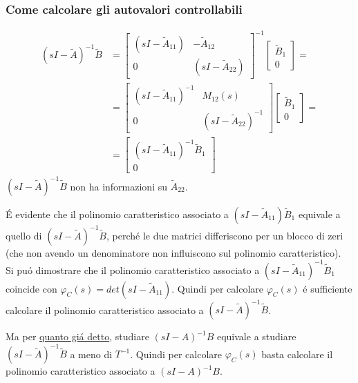 \documentclass[../main.tex]{subfiles}
\begin{document}
	\subsubsection{Come calcolare gli autovalori controllabili}
		\begin{align*}
			(sI-\tilde A)^{-1} \tilde B &=
			\begin{bmatrix}
				(sI-\tilde A_{11}) & -\tilde A_{12}\\
				0 & (sI-\tilde A_{22})
			\end{bmatrix}^{-1}
			\begin{bmatrix}
				\tilde B_1\\
				0
			\end{bmatrix} =\\
			&= \begin{bmatrix}
				(sI-\tilde A_{11})^{-1} & M_{12}(s)\\
				0 & (sI-\tilde A_{22})^{-1}
			\end{bmatrix}
			\begin{bmatrix}
				\tilde B_1\\
				0
			\end{bmatrix} =\\
			&= \begin{bmatrix}
				(sI-\tilde A_{11})^{-1} \tilde B_1\\
				0
			\end{bmatrix}
		\end{align*}
		$ (sI-\tilde A)^{-1} \tilde B $ non ha informazioni su $ \tilde A_{22} $.
		
		\'E evidente che il polinomio caratteristico associato a $ (sI-\tilde A_{11}) \tilde B_1 $ equivale a quello di $ (sI - \tilde A)^{-1} \tilde B $, perch\'e le due matrici differiscono per un blocco di zeri (che non avendo un denominatore non influiscono sul polinomio caratteristico).\\
		Si pu\'o dimostrare che il polinomio caratteristico associato a $ (sI-\tilde A_{11})^{-1} \tilde B_1 $ coincide con $ \varphi_C(s) = det(sI-\tilde A_{11}) $. Quindi per calcolare $ \varphi_C(s) $ \'e sufficiente calcolare il polinomio caratteristico associato a $ (sI-\tilde A)^{-1} \tilde B $.
		
		Ma per \hyperref[sentece:calcolo-autovalori]{quanto gi\'a detto}, studiare $ (sI-A)^{-1} B $ equivale a studiare $ (sI-\tilde A)^{-1} \tilde B $ a meno di $ T^{-1} $. Quindi per calcolare $ \varphi_C(s) $ basta calcolare il polinomio caratteristico associato a $ (sI-A)^{-1} B $.
\end{document}
